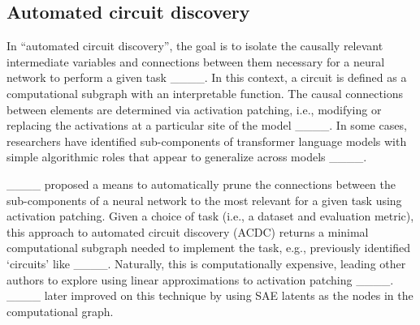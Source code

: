 %
%
%

\subsection{Automated circuit discovery}

In ``automated circuit discovery'', the goal is to isolate the causally relevant intermediate variables and connections between them necessary for a neural network to perform a given task ____.
In this context, a circuit is defined as a computational subgraph with an interpretable function.
The causal connections between elements are determined via activation patching, i.e., modifying or replacing the activations at a particular site of the model ____.
In some cases, researchers have identified sub-components of transformer language models with simple algorithmic roles that appear to generalize across models ____.

____ proposed a means to automatically prune the connections between the sub-components of a neural network to the most relevant for a given task using activation patching.
Given a choice of task (i.e., a dataset and evaluation metric), this approach to automated circuit discovery (ACDC) returns a minimal computational subgraph needed to implement the task, e.g., previously identified `circuits' like ____.
Naturally, this is computationally expensive, leading other authors to explore using linear approximations to activation patching ____.
____ later improved on this technique by using SAE latents as the nodes in the computational graph.

